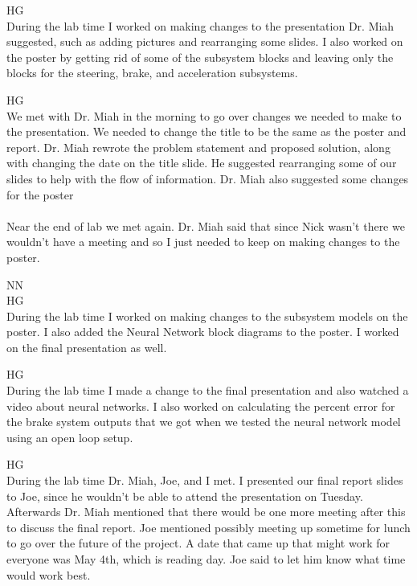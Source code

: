 \documentclass[fontsize=11pt, %
                             paper=letter, %
                             openany, %
                             captions=tableheading,
                             index=totoc,
                             hyperref]{labbook}
\def\currentYear{2021}
\begin{document}
\begin{addmargin}[0cm]{0cm}
HG\\
During the lab time I worked on making changes to the presentation Dr. Miah suggested, such as adding pictures and rearranging some slides. I also worked on the poster by getting rid of some of the subsystem blocks and leaving only the blocks for the steering, brake, and acceleration subsystems. 

HG\\
We met with Dr. Miah in the morning to go over changes we needed to make to the presentation. We needed to change the title to be the same as the poster and report. Dr. Miah rewrote the problem statement and proposed solution, along with changing the date on the title slide. He suggested rearranging some of our slides to help with the flow of information. Dr. Miah also suggested some changes for the poster
\\
\\
Near the end of lab we met again. Dr. Miah said that since Nick wasn't there we wouldn't have a meeting and so I just needed to keep on making changes to the poster. 


\labday{Wednesday, April 20, \currentYear}
NN\\


HG\\ 
During the lab time I worked on making changes to the subsystem models on the poster. I also added the Neural Network block diagrams to the poster. I worked on the final presentation as well. 


\labday{Monday, April 25, \currentYear}
HG\\
During the lab time I made a change to the final presentation and also watched a video about neural networks. I also worked on calculating the percent error for the brake system outputs that we got when we tested the neural network model using an open loop setup. 

HG\\ 
During the lab time Dr. Miah, Joe, and I met. I presented our final report slides to Joe, since he wouldn't be able to attend the presentation on Tuesday. Afterwards Dr. Miah mentioned that there would be one more meeting after this to discuss the final report. Joe mentioned possibly meeting up sometime for lunch to go over the future of the project. A date that came up that might work for everyone was May 4th, which is reading day. Joe said to let him know what time would work best. 


\end{addmargin}
\end{document}
